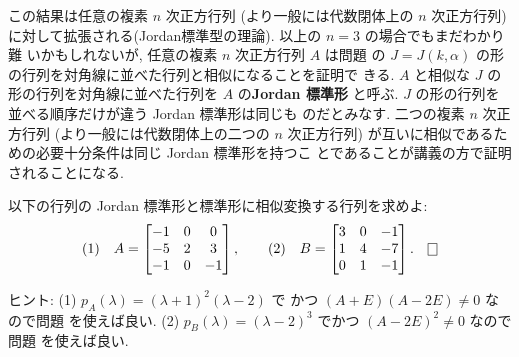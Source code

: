 \documentclass[12pt,twoside]{jarticle}
\begin{document}
この結果は任意の複素 $n$ 次正方行列 (より一般には代数閉体上の $n$ 次正方行列)
に対して拡張される(Jordan標準型の理論).  以上の $n=3$ の場合でもまだわかり難
いかもしれないが, 任意の複素 $n$ 次正方行列 $A$ は問題  
の $J = J(k,\alpha)$ の形の行列を対角線に並べた行列と相似になることを証明で
きる.  $A$ と相似な $J$ の形の行列を対角線に並べた行列を $A$ の{\bf Jordan 
標準形} と呼ぶ.  $J$ の形の行列を並べる順序だけが違う Jordan 標準形は同じも
のだとみなす.  二つの複素 $n$ 次正方行列 (より一般には代数閉体上の二つの $n$ 
次正方行列) が互いに相似であるための必要十分条件は同じ Jordan 標準形を持つこ
とであることが講義の方で証明されることになる.


\begin{question}
\label{q:jordan-3x3-1}
  以下の行列の Jordan 標準形と標準形に相似変換する行列を求めよ:
  \begin{equation*}
    \text{(1)}\quad
    A =
    \begin{bmatrix}
      -1 &  0 &  0 \\
      -5 &  2 &  3 \\
      -1 &  0 & -1 \\
    \end{bmatrix},
    \qquad
    \text{(2)}\quad
    B =
    \begin{bmatrix}
      3 & 0 & -1 \\
      1 & 4 & -7 \\
      0 & 1 & -1 \\
    \end{bmatrix}.
    \qed
  \end{equation*}
\end{question}

\noindent
ヒント: (1) $p_A(\lambda)=(\lambda+1)^2(\lambda-2)$ で
かつ $(A+E)(A-2E)\ne 0$ なので問題  を使えば良い. 
(2) $p_B(\lambda)=(\lambda-2)^3$ でかつ $(A-2E)^2\ne0$ なので
問題  を使えば良い.
\end{document}
